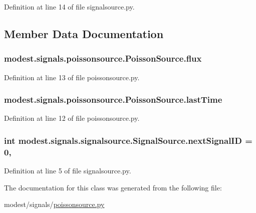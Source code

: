 Definition at line 14 of file signalsource.\+py.



\subsection{Member Data Documentation}
\subsubsection[{\texorpdfstring{flux}{flux}}]{\setlength{\rightskip}{0pt plus 5cm}modest.\+signals.\+poissonsource.\+Poisson\+Source.\+flux}\hypertarget{classmodest_1_1signals_1_1poissonsource_1_1PoissonSource_a6f2c657ad936b921715d826ac74f7fe5}{}\label{classmodest_1_1signals_1_1poissonsource_1_1PoissonSource_a6f2c657ad936b921715d826ac74f7fe5}


Definition at line 13 of file poissonsource.\+py.

\subsubsection[{\texorpdfstring{last\+Time}{lastTime}}]{\setlength{\rightskip}{0pt plus 5cm}modest.\+signals.\+poissonsource.\+Poisson\+Source.\+last\+Time}\hypertarget{classmodest_1_1signals_1_1poissonsource_1_1PoissonSource_a34395fc83bd8743a0a5ee69f9392a606}{}\label{classmodest_1_1signals_1_1poissonsource_1_1PoissonSource_a34395fc83bd8743a0a5ee69f9392a606}


Definition at line 12 of file poissonsource.\+py.

\subsubsection[{\texorpdfstring{next\+Signal\+ID}{nextSignalID}}]{\setlength{\rightskip}{0pt plus 5cm}int modest.\+signals.\+signalsource.\+Signal\+Source.\+next\+Signal\+ID = 0\hspace{0.3cm}{\ttfamily [static]}, {\ttfamily [inherited]}}\hypertarget{classmodest_1_1signals_1_1signalsource_1_1SignalSource_a453eafb550b551adbec0903deb63dfce}{}\label{classmodest_1_1signals_1_1signalsource_1_1SignalSource_a453eafb550b551adbec0903deb63dfce}


Definition at line 5 of file signalsource.\+py.



The documentation for this class was generated from the following file\+:\begin{DoxyCompactItemize}
\item 
modest/signals/\hyperlink{poissonsource_8py}{poissonsource.\+py}\end{DoxyCompactItemize}
